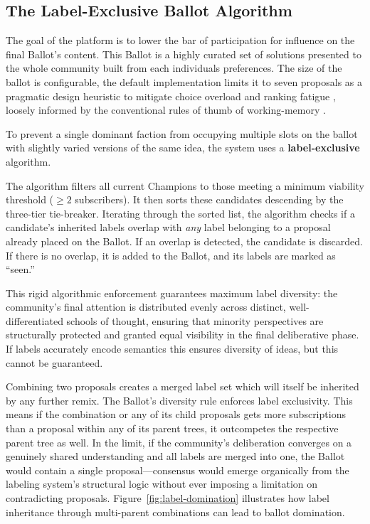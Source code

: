 \documentclass[a4paper, 12pt, twoside]{iviathesis}
\begin{document}
\subsection{The Label-Exclusive Ballot Algorithm}
\label{sec:ballot-algorithm}
The goal of the platform is to lower the bar of participation for influence on the final Ballot's content. This Ballot is a highly curated set of solutions presented to the whole community built from each individuals preferences. The size of the ballot is configurable, the default implementation limits it to seven proposals as a pragmatic design heuristic to mitigate choice overload and ranking fatigue \cite{iyengar2000choice}, loosely informed by the conventional rules of thumb of working-memory \cite{miller1956}.

To prevent a single dominant faction from occupying multiple slots on the ballot with slightly varied versions of the same idea, the system uses a \textbf{label-exclusive} algorithm. 

The algorithm filters all current Champions to those meeting a minimum viability threshold ($\ge 2$ subscribers). It then sorts these candidates descending by the three-tier tie-breaker. Iterating through the sorted list, the algorithm checks if a candidate's inherited labels overlap with \textit{any} label belonging to a proposal already placed on the Ballot. If an overlap is detected, the candidate is discarded. If there is no overlap, it is added to the Ballot, and its labels are marked as ``seen.''

This rigid algorithmic enforcement guarantees maximum label diversity: the community's final attention is distributed evenly across distinct, well-differentiated schools of thought, ensuring that minority perspectives are structurally protected and granted equal visibility in the final deliberative phase. If labels accurately encode semantics this ensures diversity of ideas, but this cannot be guaranteed.

Combining two proposals creates a merged label set which will itself be inherited by any further remix. 
The Ballot's diversity rule enforces label exclusivity. This means if the combination or any of its child proposals gets more subscriptions than a proposal within any of its parent trees, it outcompetes the respective parent tree as well. 
In the limit, if the community's deliberation converges on a genuinely shared understanding and all labels are merged into one, the Ballot would contain a single proposal---consensus would emerge organically from the labeling system's structural logic without ever imposing a limitation on contradicting proposals. Figure~\ref{fig:label-domination} illustrates how label inheritance through multi-parent combinations can lead to ballot domination.
\end{document}
